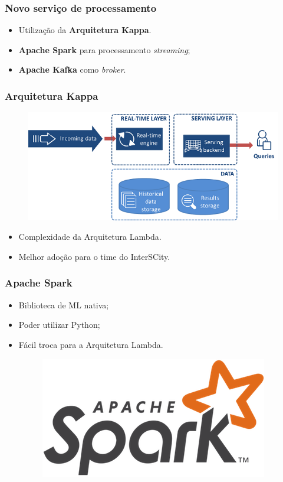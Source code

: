 \documentclass{beamer}
\begin{document}
  \begin{frame}
      \frametitle{Novo serviço de processamento}
      \begin{itemize}
          \item<2-> Utilização da \textbf{Arquitetura Kappa}.
          \item<3-> \textbf{Apache Spark} para processamento \textit{streaming};
          \item<4-> \textbf{Apache Kafka} como \textit{broker}.
      \end{itemize}
  \end{frame}

  \begin{frame}
      \frametitle{Arquitetura Kappa}
      \begin{figure}
          \includegraphics[scale=0.4]{figures/KappaArchitecture.png}
      \end{figure}
      \begin{itemize}
          \item Complexidade da Arquitetura Lambda.
          \item Melhor adoção para o time do InterSCity.
      \end{itemize}
  \end{frame}

  \begin{frame}
      \frametitle{Apache Spark}
      \begin{itemize}
          \item Biblioteca de ML nativa;
          \item Poder utilizar Python;
          \item Fácil troca para a Arquitetura Lambda.
              \begin{figure}
                  \includegraphics[scale=0.3]{figures/spark_logo.png}
              \end{figure}
      \end{itemize}
  \end{frame}
\end{document}
